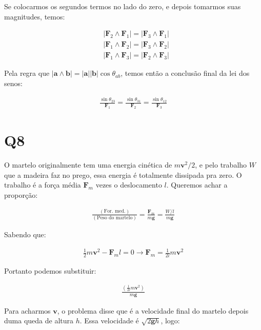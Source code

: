 \documentclass{antiquebook}
\begin{document}
	Se colocarmos os segundos termos no lado do zero, e depois tomarmos suas magnitudes, temos:

	\begin{align*}
		&|\mathbf{F}_2\wedge\mathbf{F}_1| = |\mathbf{F}_3\wedge\mathbf{F}_1|  \\
		&|\mathbf{F}_1\wedge\mathbf{F}_2| = |\mathbf{F}_3\wedge\mathbf{F}_2|  \\
		&|\mathbf{F}_1\wedge\mathbf{F}_3| = |\mathbf{F}_2\wedge\mathbf{F}_3| 
	\end{align*}

	Pela regra que $|\mathbf{a}\wedge\mathbf{b}| = |\mathbf{a}| |\mathbf{b}| \cos \theta_{ab}$,
	temos então a conclusão final da lei dos senos:

	\begin{align*}
		\frac{\sin \theta_{23}}{\mathbf{F}_1} = \frac{\sin \theta_{31}}{\mathbf{F}_2} = \frac{\sin \theta_{12}}{\mathbf{F}_3}
	\end{align*}

	\section{Q8}

	O martelo originalmente tem uma energia cinética de $m\mathbf{v}^2/2$, e pelo
	trabalho $W$ que a madeira faz no prego, essa energia é totalmente dissipada
	pra zero. O trabalho é a força média $\mathbf{F}_m$ vezes o deslocamento
	$l$. Queremos achar a proporção:

	\begin{align*}
		\frac{(\text{For. med.})}{(\text{Peso do martelo})} = 
		\frac{\mathbf{F}_m}{{m}\mathbf{g}} = \frac{W/l}{{m}\mathbf{g}}
	\end{align*}

	Sabendo que:

	\begin{align*}
		\frac{1}{2}m\mathbf{v}^2 - \mathbf{F}_m l = 0 \rightarrow
		\mathbf{F}_m = \frac{1}{2l}m\mathbf{v}^2
	\end{align*}

	Portanto podemos substituir:

	\begin{align*}
		\frac{ \left ( \frac{1}{2l}m\mathbf{v}^2  \right ) }{m\mathbf{g}}
	\end{align*}

	Para acharmos $\mathbf{v}$, o problema disse que é a velocidade
	final do martelo depois duma queda de altura $h$. Essa velocidade é
	$\sqrt{2\mathbf{g}h}$, logo:
\end{document}
